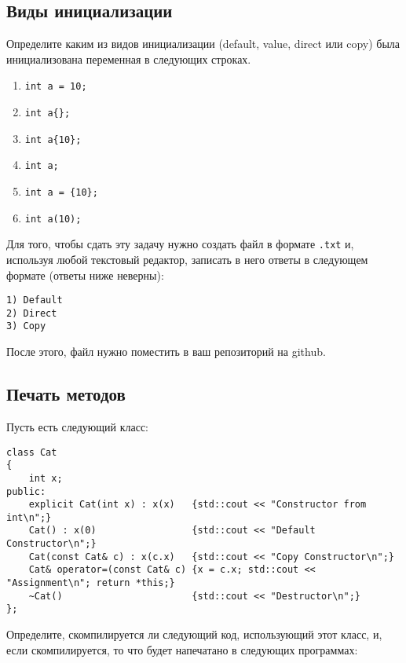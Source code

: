 \documentclass{article}
\begin{document}
\subsection{Виды инициализации}
Определите каким из видов инициализации (default, value, direct или copy) была инициализована переменная в следующих строках. 
\begin{enumerate}
\item \lstinline|int a = 10;|
\item \lstinline|int a{};|
\item \lstinline|int a{10};|
\item \lstinline|int a;|
\item \lstinline|int a = {10};|
\item \lstinline|int a(10);|
\end{enumerate}
Для того, чтобы сдать эту задачу нужно создать файл в формате \texttt{.txt} и, используя любой текстовый редактор, записать в него ответы в следующем формате (ответы ниже неверны):
\begin{verbatim}
1) Default
2) Direct
3) Copy
\end{verbatim} 
После этого, файл нужно поместить в ваш репозиторий на github.


\subsection{Печать методов}
Пусть есть следующий класс:
\begin{lstlisting}
class Cat
{
	int x;
public:
	explicit Cat(int x) : x(x)   {std::cout << "Constructor from int\n";}
	Cat() : x(0)                 {std::cout << "Default Constructor\n";}
	Cat(const Cat& c) : x(c.x)   {std::cout << "Copy Constructor\n";}
	Cat& operator=(const Cat& c) {x = c.x; std::cout << "Assignment\n"; return *this;}
	~Cat()                       {std::cout << "Destructor\n";}
};
\end{lstlisting}
Определите, скомпилируется ли следующий код, использующий этот класс, и, если скомпилируется, то что будет напечатано в следующих программах:
\end{document}
